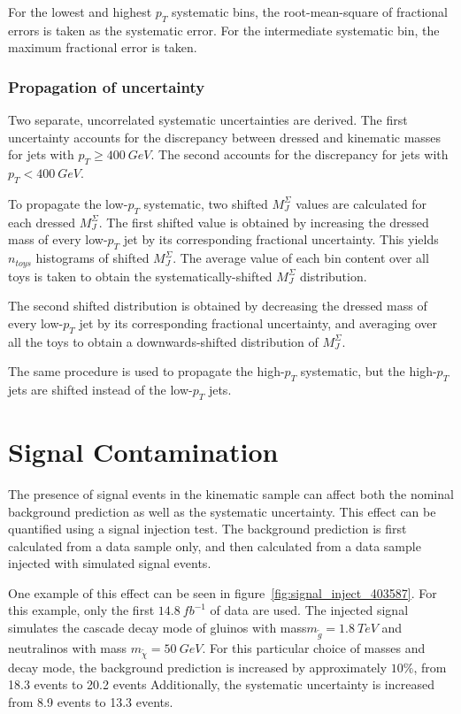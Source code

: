For the lowest and highest $p_T$ systematic bins, the root-mean-square of fractional errors is taken as the systematic error.
For the intermediate systematic bin, the maximum fractional error is taken.

\subsubsection{Propagation of uncertainty}
Two separate, uncorrelated systematic uncertainties are derived.
The first uncertainty accounts for the discrepancy between dressed and kinematic masses for jets with $p_T \geq 400~GeV$.
The second accounts for the discrepancy for jets with $p_T < 400~GeV$.

To propagate the low-$p_T$ systematic, two shifted $M_{J}^{\Sigma}$ values are calculated for each dressed $M_{J}^{\Sigma}$.
The first shifted value is obtained by increasing the dressed mass of every low-$p_T$ jet by its corresponding fractional uncertainty.
This yields $n_{toys}$ histograms of shifted $M_{J}^{\Sigma}$.
The average value of each bin content over all toys is taken to obtain the systematically-shifted $M_{J}^{\Sigma}$ distribution.

The second shifted distribution is obtained by decreasing the dressed mass of every low-$p_T$ jet by its corresponding fractional uncertainty,
and averaging over all the toys to obtain a downwards-shifted distribution of $M_{J}^{\Sigma}$.

The same procedure is used to propagate the high-$p_T$ systematic, but the high-$p_T$ jets are shifted instead of the low-$p_T$ jets.

\section{Signal Contamination}\label{sec:signal_contamination}
The presence of signal events in the kinematic sample can affect both the nominal background prediction as well as the systematic uncertainty.
This effect can be quantified using a signal injection test.
The background prediction is first calculated from a data sample only, and then calculated from a data sample injected with simulated signal events.

One example of this effect can be seen in figure~\ref{fig:signal_inject_403587}.
For this example, only the first $14.8~fb^{-1}$ of data are used.
The injected signal simulates the cascade decay mode of gluinos with mass$m_{\tilde{g}}=1.8~TeV$ and neutralinos with mass $m_{\tilde{\chi}}=50~GeV$.
For this particular choice of masses and decay mode, the background prediction is increased by approximately $10\%$, from 18.3 events to 20.2 events
Additionally, the systematic uncertainty is increased from 8.9 events to 13.3 events.

